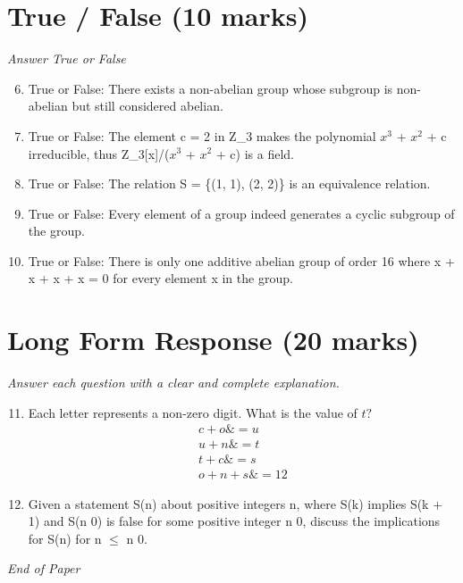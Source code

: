 \documentclass[12pt]{article}
\begin{document}
\section*{True / False (10 marks)}
\textit{Answer True or False}
\begin{enumerate}[label=\arabic*.]
\setcounter{enumi}{5}
\item True or False: There exists a non-abelian group whose subgroup is non-abelian but still considered abelian.
\item True or False: The element c = 2 in Z\_3 makes the polynomial $x^3$ + $x^2$ + c irreducible, thus Z\_3[x]/($x^3$ + $x^2$ + c) is a field.
\item True or False: The relation S = \{(1, 1), (2, 2)\} is an equivalence relation.
\item True or False: Every element of a group indeed generates a cyclic subgroup of the group.
\item True or False: There is only one additive abelian group of order 16 where x + x + x + x = 0 for every element x in the group.
\end{enumerate}

\section*{Long Form Response (20 marks)}
\textit{Answer each question with a clear and complete explanation.}
\begin{enumerate}[label=\arabic*.]
\setcounter{enumi}{10}
\item Each letter represents a non-zero digit. What is the value of $t?$ \begin{align*} c + o \&= u \\ u + n \&= t \\ t + c \&= s \\ o + n + s \&= 12 \end{align*}
\item Given a statement S(n) about positive integers n, where S(k) implies S(k + 1) and S(n 0) is false for some positive integer n 0, discuss the implications for S(n) for n \ensuremath{\leq} n 0.
\end{enumerate}

\vfill
\noindent\textit{End of Paper}
\end{document}
